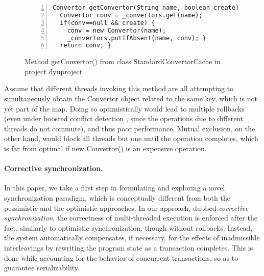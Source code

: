 
\begin{figure}
	\begin{lstlisting}[numbers=left]
Convertor getConvertor(String name, boolean create) {
  Convertor conv = _convertors.get(name);
  if(conv==null && create) {
    conv = new Convertor(name);
    _convertors.putIfAbsent(name, conv); }
  return conv; }
	\end{lstlisting}
	\caption{\label{Fi:introMotivating}Method {\sf getConvertor()} from class {\sf StandardConvertorCache} in project {\sf dyuproject}}
\end{figure}

Assume that different threads invoking this method are all attempting to simultaneously obtain the {\sf Convertor} object related to the same key, which is not yet part of the map. Doing so optimistically would lead to multiple rollbacks (even under boosted conflict detection \cite{ppopp08}, since the operations due to different threads do not commute), and thus poor performance. Mutual exclusion, on the other hand, would block all threads but one until the operation completes, which is far from optimal if {\sf new Convertor()} is an expensive operation.

\paragraph{Corrective synchronization.} In this paper, we take a first step in formulating and exploring a novel synchronization paradigm, which is conceptually different from both the pessimistic and the optimistic approaches. In our approach, dubbed \emph{corrective synchronization}, the correctness of multi-threaded execution is enforced after the fact, similarly to optimistic synchronization, though without rollbacks. Instead, the system automatically compensates, if necessary, for the effects of inadmissible interleavings by rewriting the program state as a transaction completes. This is done while accounting for the behavior of concurrent transactions, so as to guarantee serializability.

